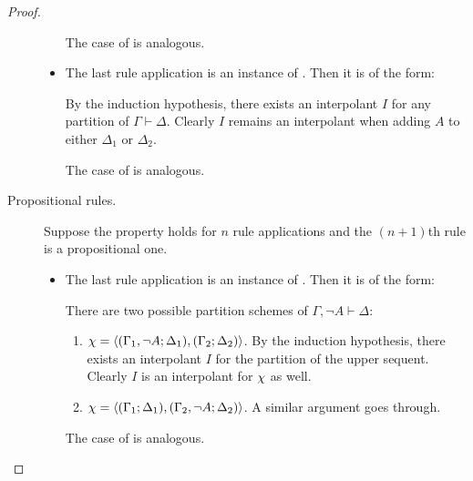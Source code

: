 \begin{proof}
\begin{description}
\begin{itemize}
\begin{enumerate}
					\end{enumerate}

					The case of  is analogous.

				\item The last rule application is an instance of . Then it is of the form:
					\begin{prooftree}
						\Axiomm{\Gamma \fCenter \Delta}
					\end{prooftree}

					By the induction hypothesis, there exists an interpolant $I$ for any partition  of $\Gamma \vdash \Delta$.
					Clearly $I$ remains an interpolant when adding $A$ to either $\Delta_1$ or $\Delta_2$.

					The case of  is analogous.

			\end{itemize}

		\item[\normalfont Propositional rules.]
			Suppose the property holds for $n$ rule applications and the $(n+1)$th rule is a propositional one.

			\begin{itemize}
				\item The last rule application is an instance of . Then it is of the form:
					\begin{prooftree}
						\Axiomm{\Gamma \fCenter \Delta,  A}
						\RightLabelm{\lkrule{\lnot}{l}}
						\UnaryInfm{\lnot A, \Gamma \fCenter \Delta }
					\end{prooftree}

					There are two possible partition schemes of $\Gamma, \lnot A \vdash \Delta$:
					\begin{enumerate}
						\item $\chi =  \langle (\Gamma_1, \lnot A; \Delta_1), (\Gamma_2; \Delta_2)\rangle $.
							By the induction hypothesis, there exists an interpolant $I$ for the partition  of the upper sequent.
							Clearly $I$ is an interpolant for $\chi$ as well.

						\item $\chi =  \langle (\Gamma_1; \Delta_1), (\Gamma_2, \lnot A; \Delta_2)\rangle $. A similar argument goes through. 
					\end{enumerate}

					The case of  is analogous.


\end{itemize}
\end{description}
\end{proof}
